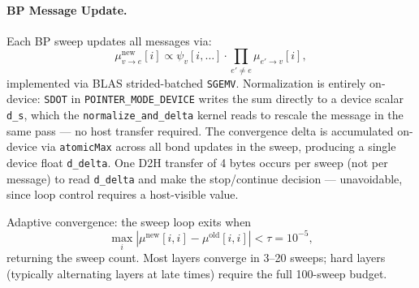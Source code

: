 \documentclass[11pt]{article}
\begin{document}
\paragraph{BP Message Update.}
Each BP sweep updates all messages via:
\begin{equation}
 \mu_{v \to e}^{\text{new}}[i] \propto
 \psi_v[i, \ldots] \cdot \prod_{e' \neq e} \mu_{e' \to v}[i],
 \label{eq:bp}
\end{equation}
implemented via BLAS strided-batched \texttt{SGEMV}.
Normalization is entirely on-device: \texttt{SDOT} in
\texttt{POINTER\_MODE\_DEVICE} writes the sum directly to a device scalar
\texttt{d\_s}, which the \texttt{normalize\_and\_delta} kernel reads to rescale
the message in the same pass --- no host transfer required.
The convergence delta is accumulated on-device via \texttt{atomicMax} across
all bond updates in the sweep, producing a single device float \texttt{d\_delta}.
One D2H transfer of 4 bytes occurs per sweep (not per message) to read
\texttt{d\_delta} and make the stop/continue decision --- unavoidable, since
loop control requires a host-visible value.

Adaptive convergence: the sweep loop exits when
\begin{equation}
 \max_i |\mu^{\text{new}}[i,i] - \mu^{\text{old}}[i,i]| < \tau = 10^{-5},
 \label{eq:bp_tol}
\end{equation}
returning the sweep count. Most layers converge in 3--20 sweeps; hard layers
(typically alternating layers at late times) require the full 100-sweep budget.
\end{document}
